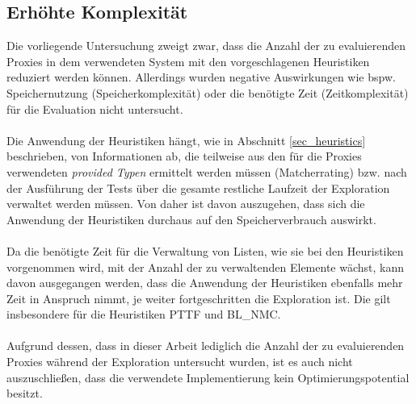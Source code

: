 \subsection{Erhöhte Komplexität}
Die vorliegende Untersuchung zweigt zwar, dass die Anzahl der zu evaluierenden Proxies in dem verwendeten System mit den vorgeschlagenen Heuristiken reduziert werden können. Allerdings wurden negative Auswirkungen wie bspw. Speichernutzung (Speicherkomplexität) oder die benötigte Zeit  (Zeitkomplexität) für die Evaluation nicht untersucht.
\\\\
Die Anwendung der Heuristiken hängt, wie in Abschnitt \ref{sec_heuristics} beschrieben, von Informationen ab, die teilweise aus den für die Proxies verwendeten \emph{provided Typen} ermittelt werden müssen (Matcherrating) bzw. nach der Ausführung der Tests über die gesamte restliche Laufzeit der Exploration verwaltet werden müssen. Von daher ist davon auszugehen, dass sich die Anwendung der Heuristiken durchaus auf den Speicherverbrauch auswirkt.
\\\\
Da die benötigte Zeit für die Verwaltung von Listen, wie sie bei den Heuristiken vorgenommen wird, mit der Anzahl der zu verwaltenden Elemente wächst, kann davon ausgegangen werden, dass die Anwendung der Heuristiken ebenfalls mehr Zeit in Anspruch nimmt, je weiter fortgeschritten die Exploration ist. Die gilt insbesondere für die Heuristiken PTTF und BL\_NMC. 
\\\\
Aufgrund dessen, dass in dieser Arbeit lediglich die Anzahl der zu evaluierenden Proxies während der Exploration untersucht wurden, ist es auch nicht auszuschließen, dass die verwendete Implementierung kein Optimierungspotential besitzt.


